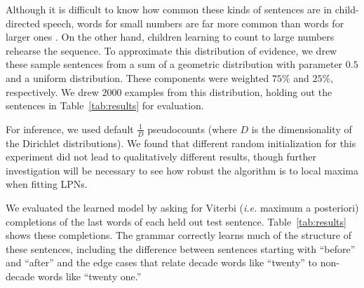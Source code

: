 \documentclass{article} %
\begin{document}
Although it is difficult to know how common these kinds of sentences
are in child-directed speech, words for small numbers are far more
common than words for larger ones \cite{macwhinney2000childes}. On the
other hand, children learning to count to large numbers rehearse the
sequence. To approximate this distribution of evidence, we drew these
sample sentences from a sum of a geometric distribution with parameter
$0.5$ and a uniform distribution. These components were weighted
$75\%$ and $25\%$, respectively. We drew $2000$ examples from this
distribution, holding out the sentences in Table~\ref{tab:results} for
evaluation.

For inference, we used default $\frac{1}{D}$ pseudocounts (where $D$ is the
dimensionality of the Dirichlet distributions). We found that different random
initialization for this experiment did not lead to qualitatively different
results, though further investigation will be necessary to see how
robust the algorithm is to local maxima when fitting LPNs.

We evaluated the learned model by asking for Viterbi ({\it i.e.} maximum a
posteriori) completions of the last words of each held out test
sentence. Table~\ref{tab:results} shows these completions. The grammar
correctly learns much of the structure of these sentences, including
the difference between sentences starting with ``before'' and
``after'' and the edge cases that relate decade words like ``twenty''
to non-decade words like ``twenty one.''
\end{document}
